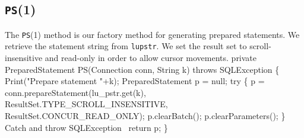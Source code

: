 \documentclass{article}
\def\nwendcode{\endtrivlist \endgroup}      %
\let\nwdocspar=\par
\theoremstyle{definition}                   %
\begin{document}
\subsection{{\tt{}\protect{}PS}(1)}
The {\tt{}\protect{}PS}(1) method is our factory method for generating prepared statements.
We retrieve the statement string from {\tt{}\protect{}lu{}pstr}.  We set the result set to
scroll-insensitive and read-only in order to allow cursor movements.
\nwenddocs{}\endmoddef{}
private PreparedStatement PS(Connection conn, String k) throws SQLException \{
  Print("Prepare statement "+k);
  PreparedStatement p = null;
  try \{
    p = conn.prepareStatement(lu_pstr.get(k),
      ResultSet.TYPE_SCROLL_INSENSITIVE, ResultSet.CONCUR_READ_ONLY);
    p.clearBatch();
    p.clearParameters();
  \}
  \LA{}Catch and throw \code{}SQLException\edoc{}~{\nwtagstyle{}}\RA{}
  return p;
\}
\eatline
{}\nwendcode{}\nwdocspar
\end{document}
